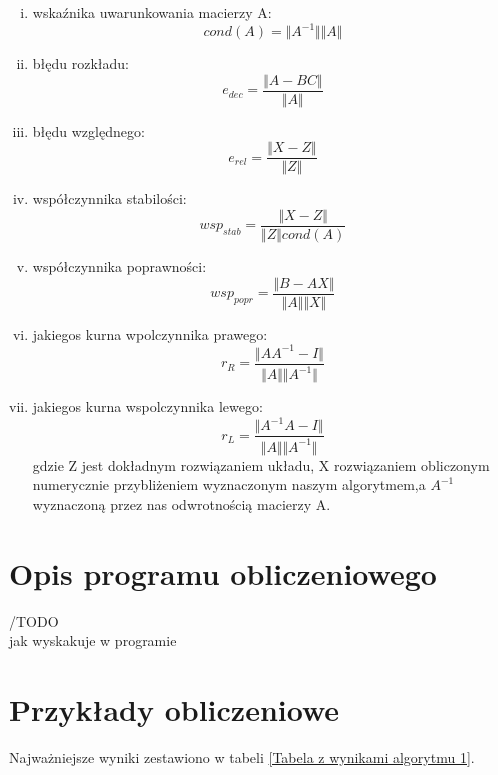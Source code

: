 \documentclass[12pt]{article}
\begin{document}
\begin{enumerate}[i)]
\item wska\'znika uwarunkowania macierzy A:
\[
cond(A)=\Vert A^{-1}\Vert  \Vert A \Vert
\]
\item b\l{}\k{e}du rozk\l{}adu:
\[
e_{dec}=\frac{\Vert A-BC \Vert}{\Vert A \Vert}
\]
\item b\l{}\k{e}du wzgl\k{e}dnego:
\[
e_{rel}=\frac{\Vert X-Z \Vert}{\Vert Z \Vert}
\]
\item wsp\'o\l{}czynnika stabilo\'sci:
\[
wsp_{stab}=\frac{\Vert X-Z \Vert}{\Vert Z \Vert cond(A)}
\]
\item wsp\'o\l{}czynnika poprawno\'sci:
\[
wsp_{popr}=\frac{\Vert B-AX \Vert}{\Vert A \Vert \Vert X \Vert}
\]
\item jakiegos kurna wpolczynnika prawego:
\[
r_{R}=\frac{\Vert AA^{-1}-I\Vert}{\Vert A \Vert \Vert A^{-1} \Vert}
\]
\item jakiegos kurna wspolczynnika lewego:
\[
r_{L}=\frac{\Vert A^{-1}A-I\Vert}{\Vert A \Vert \Vert A^{-1} \Vert}
\]
gdzie Z jest dok\l{}adnym rozwi\k{a}zaniem uk\l{}adu, X rozwi\k{a}zaniem obliczonym numerycznie przybli\.zeniem wyznaczonym naszym algorytmem,a $A^{-1}$ wyznaczon\k{a} przez nas odwrotno\'sci\k{a} macierzy A. 


\end{enumerate}

\vskip20pt

\section{Opis programu obliczeniowego}


/TODO
\\
jak wyskakuje w programie

\vskip20pt

\section{Przyk\l ady obliczeniowe}

\noindent 

Najwa\.zniejsze wyniki zestawiono w tabeli \ref{Tabela z wynikami algorytmu 1}.

\bigskip
\end{document}
